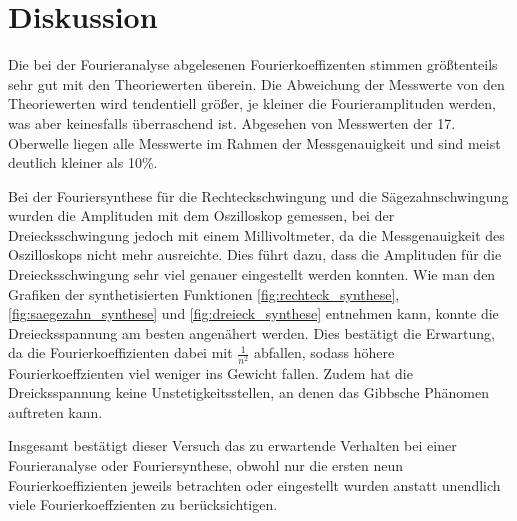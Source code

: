\section{Diskussion}
\label{sec:Diskussion}
Die bei der Fourieranalyse abgelesenen Fourierkoeffizenten stimmen größtenteils
sehr gut mit den Theoriewerten überein. Die Abweichung der Messwerte von den
Theoriewerten wird tendentiell größer, je kleiner die Fourieramplituden werden,
was aber keinesfalls überraschend ist. Abgesehen von Messwerten der 17. Oberwelle
liegen alle Messwerte im Rahmen der Messgenauigkeit und sind meist deutlich
kleiner als 10\%.

Bei der Fouriersynthese für die Rechteckschwingung und die Sägezahnschwingung
wurden die Amplituden mit dem Oszilloskop gemessen, bei der Dreiecksschwingung
jedoch mit einem Millivoltmeter, da die Messgenauigkeit des Oszilloskops nicht
mehr ausreichte. Dies führt dazu, dass die Amplituden für die Dreiecksschwingung
sehr viel genauer eingestellt werden konnten.\newline
Wie man den Grafiken der synthetisierten Funktionen \ref{fig:rechteck_synthese},
\ref{fig:saegezahn_synthese} und \ref{fig:dreieck_synthese} entnehmen kann, konnte
die Dreiecksspannung am besten angenähert werden. Dies bestätigt die Erwartung,
da die Fourierkoeffizienten dabei mit $\frac{1}{n^2}$ abfallen, sodass höhere
Fourierkoeffzienten viel weniger ins Gewicht fallen. Zudem hat die Dreicksspannung
keine Unstetigkeitsstellen, an denen das Gibbsche Phänomen auftreten kann.

Insgesamt bestätigt dieser Versuch das zu erwartende Verhalten bei einer
Fourieranalyse oder Fouriersynthese, obwohl nur die ersten neun Fourierkoeffizienten
jeweils betrachten oder eingestellt wurden anstatt unendlich viele Fourierkoeffzienten
zu berücksichtigen.
